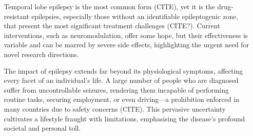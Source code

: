 \documentclass[10pt]{article}
\begin{document}
\begin{sloppypar}
  Temporal lobe epilepsy is the most common form (CITE), yet it is the drug-resistant epilepsies, especially those without an identifiable epileptogenic zone, that present the most significant treatment challenges (CITE?). Current interventions, such as neuromodulation, offer some hope, but their effectiveness is variable and can be marred by severe side effects, highlighting the urgent need for novel research directions.

  The impact of epilepsy extends far beyond its physiological symptoms, affecting every facet of an individual's life. A large number of people who are diagnosed suffer from uncontrollable seizures, rendering them incapable of performing routine tasks, securing employment, or even driving—a prohibition enforced in many countries due to safety concerns (CITE). This pervasive uncertainty cultivates a lifestyle fraught with limitations, emphasising the disease's profound societal and personal toll.

  \begin{figure}[ht]
    \centering
    \label{fig:seizure-eeg}
  \end{figure}


\end{sloppypar}
\end{document}
